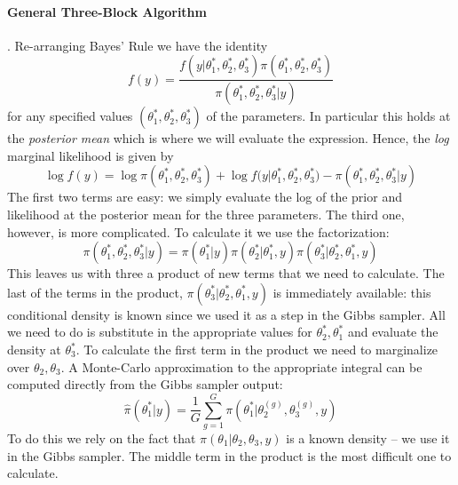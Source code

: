 \documentclass[12pt]{article}
\begin{document}
\paragraph{General Three-Block Algorithm}.
Re-arranging Bayes' Rule we have the identity
\begin{equation*}
f(y) = \frac{f(y|\theta_1^*, \theta^*_2, \theta_3^*)\pi\left( \theta^*_1, \theta^*_2, \theta^*_3 \right)}{\pi\left( \theta_1^*, \theta_2^*, \theta_3^*|y \right)}
\end{equation*}
for any specified values $(\theta_1^*, \theta_2^*, \theta_3^*)$ of the parameters.
In particular this holds at the \emph{posterior mean} which is where we will evaluate the expression.
Hence, the \emph{log} marginal likelihood is given by
\begin{equation*}
\log{f(y)} =  \log \pi\left( \theta^*_1, \theta^*_2, \theta^*_3 \right) + \log{f(y|\theta^*_1, \theta^*_2, \theta^*_3}) - \pi\left( \theta^*_1, \theta^*_2, \theta^*_3|y \right)
\end{equation*}
The first two terms are easy: we simply evaluate the log of the prior and likelihood at the posterior mean for the three parameters.
The third one, however, is more complicated.
To calculate it we use the factorization:
\begin{equation*}
\pi\left( \theta^*_1, \theta^*_2, \theta^*_3|y \right) = \pi(\theta^*_1|y) \pi\left( \theta^*_2|\theta^*_1,y \right)\pi\left( \theta^*_3|\theta^*_2, \theta^*_1,y \right)
\end{equation*}
This leaves us with three a product of new terms that we need to calculate.
The last of the terms in the product, $\pi(\theta^*_3|\theta^*_2, \theta^*_1, y)$ is immediately available: this conditional density is known since we used it as a step in the Gibbs sampler.
All we need to do is substitute in the appropriate values for $\theta^*_2,\theta^*_1$ and evaluate the density at $\theta^*_3$.
To calculate the first term in the product we need to marginalize over $\theta_2, \theta_3$.
A Monte-Carlo approximation to the appropriate integral can be computed directly from the Gibbs sampler output:
\begin{equation*}
\widehat{\pi}\left( \theta^*_1|y \right) = \frac{1}{G}\sum_{g=1}^{G} \pi\left( \theta^*_1|\theta_2^{(g)}, \theta_3^{(g)}, y \right)
\end{equation*}
To do this we rely on the fact that $\pi(\theta_1|\theta_2, \theta_3, y)$ is a known density -- we use it in the Gibbs sampler.
The middle term in the product is the most difficult one to calculate.
\end{document}
